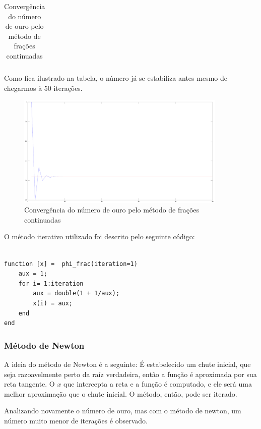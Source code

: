\documentclass[a4paper]{article}
\begin{document}
\begin{table}[H]
\begin{tabular}{|c|c|c|c|}
	\end{tabular}
	\label{golden_fraction}
	\caption{Convergência do número de ouro pelo método de frações continuadas}
\end{table}

Como fica ilustrado na tabela, o número já se estabiliza antes mesmo de chegarmos à 50 iterações.

\begin{figure}[H]
    \centering
    \includegraphics[width=100mm]{golden_frac.png}
    \caption{Convergência do número de ouro pelo método de frações continuadas}
    \label{golden_frac}
\end{figure}


O método iterativo utilizado foi descrito pelo seguinte código:

\begin{lstlisting}

function [x] =  phi_frac(iteration=1)
	aux = 1;
	for i= 1:iteration
		aux = double(1 + 1/aux);
		x(i) = aux;
	end
end

\end{lstlisting}

\subsubsection{Método de Newton}

A ideia do método de Newton é a seguinte: É estabelecido um chute inicial, que seja razoavelmente perto da raíz verdadeira, então a função é aproximada por sua reta tangente. O $x$ que intercepta a reta e a função é computado, e ele será uma melhor aproximação que o chute inicial. O método, então, pode ser iterado.

Analizando novamente o número de ouro, mas com o método de newton, um número muito menor de iterações é observado.
\end{document}
